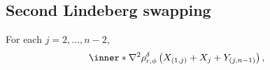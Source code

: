 \documentclass[aos]{imsart}
\begin{document}
\begin{appendix}
\subsection{Second Lindeberg swapping} \label{sec:second_lindeberg_swapping}
For each $j = 2, \dots, n-2$,
\begin{equation*}
\begin{aligned}
    & \inner*{
            \nabla^2 \rho_{r,\phi}^\delta\left(
              X_{(1,j)} + X_j + Y_{(j,n-1)}
            \right),
}
\end{aligned}
\end{equation*}
\end{appendix}
\end{document}
